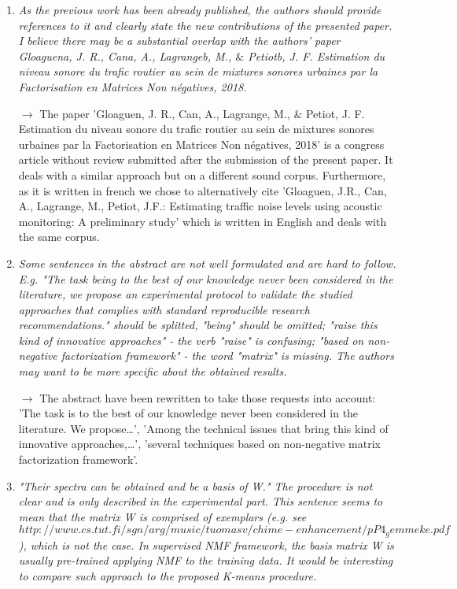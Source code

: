 \documentclass[10pt]{article}
\begin{document}
\begin{enumerate}
\item \emph{As the previous work has been already published, the authors should provide references to it and clearly state the new contributions of the presented paper. I believe there may be a substantial overlap with the authors' paper Gloaguena, J. R., Cana, A., Lagrangeb, M., $\&$ Petiotb, J. F. Estimation du niveau sonore du trafic routier au sein de mixtures sonores urbaines par la Factorisation en Matrices Non négatives, 2018.}

$\rightarrow$ The paper 'Gloaguen, J. R., Can, A., Lagrange, M., $\&$ Petiot, J. F. Estimation du niveau sonore du trafic routier au sein de mixtures sonores urbaines par la Factorisation en Matrices Non négatives, 2018' is a congress article without review submitted after the submission of the present paper. It deals with a similar approach but on a different sound corpus.  Furthermore, as it is written in french we chose to alternatively cite 'Gloaguen, J.R., Can, A., Lagrange, M., Petiot, J.F.: Estimating traffic noise levels using acoustic monitoring: A preliminary study' which is written in English and deals with the same corpus.


\item \emph{Some sentences in the abstract are not well formulated and are hard to follow. E.g. "The task being to the best of our knowledge never been considered in the literature, we propose an experimental protocol to validate the studied approaches that complies with standard reproducible research recommendations." should be splitted, "being" should be omitted; "raise this kind of innovative approaches" - the verb "raise" is confusing; "based on non-negative factorization framework" - the word "matrix" is missing. The authors may want to be more specific about the obtained results.}

$\rightarrow$ The abstract have been rewritten to take those requests into account: 'The task is to the best of our knowledge never been considered in the literature. We propose\dots', 'Among the technical issues that bring this kind of innovative approaches,\dots ', 'several techniques based on non-negative matrix  factorization framework'.

\item \emph{"Their spectra can be obtained and be a basis of W." The procedure is not clear and is only described in the experimental part. This sentence seems to mean that the matrix W is comprised of exemplars (e.g. see $http://www.cs.tut.fi/sgn/arg/music/tuomasv/chime-enhancement/pP4_gemmeke.pdf$), which is not the case. In supervised NMF framework, the basis matrix W is usually pre-trained applying NMF to the training data. It would be interesting to compare such approach to the proposed K-means procedure.}


\end{enumerate}
\end{document}
